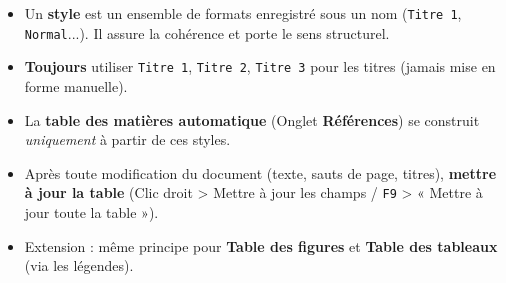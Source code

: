 \documentclass[11pt]{article}
\begin{document}
\begin{aretenir}
\begin{itemize}
    \item Un \textbf{style} est un ensemble de formats enregistré sous un nom (\texttt{Titre 1}, \texttt{Normal}...). Il assure la cohérence et porte le sens structurel.
    \item \textbf{Toujours} utiliser \texttt{Titre 1}, \texttt{Titre 2}, \texttt{Titre 3} pour les titres (jamais mise en forme manuelle).
    \item La \textbf{table des matières automatique} (Onglet \textbf{Références}) se construit \emph{uniquement} à partir de ces styles.
    \item Après toute modification du document (texte, sauts de page, titres), \textbf{mettre à jour la table} (Clic droit > Mettre à jour les champs / \texttt{F9} > « Mettre à jour toute la table »).
    \item Extension : même principe pour \textbf{Table des figures} et \textbf{Table des tableaux} (via les légendes).
\end{itemize}
\end{aretenir}
\end{document}
